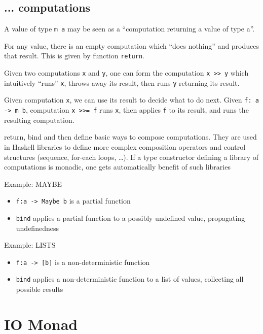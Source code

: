 \subsection{... computations}

A value of type \lstinline|m a| may be seen as a ``computation returning a value of type a''.

For any value, there is an empty computation which ``does nothing'' and
produces that result. This is given by function \lstinline|return|.

Given two computations \lstinline|x| and \lstinline|y|, one can form the computation
\lstinline|x >> y| which intuitively ``runs'' \lstinline|x|, throws away its result, then runs \lstinline|y| returning its result.

Given computation \lstinline|x|, we can use its result to decide what to do next.
Given \lstinline|f: a -> m b|, computation \lstinline|x >>= f| runs \lstinline|x|, then applies
\lstinline|f| to its result, and runs the resulting computation.


return, bind and then define basic ways to compose computations.
They are used in Haskell libraries to define more complex composition
operators and control structures (sequence, for-each loops, \dots).
If a type constructor defining a library of computations is monadic, one
gets automatically benefit of such libraries

Example: MAYBE
\begin{itemize}
	\item \lstinline|f:a -> Maybe b| is a partial function
	\item \lstinline|bind| applies a partial function to a possibly undefined value, propagating undefinedness
\end{itemize}
Example: LISTS
\begin{itemize}
	\item \lstinline|f:a -> [b]| is a non-deterministic function
	\item \lstinline|bind| applies a non-deterministic function to a list of values, collecting all possible results

\end{itemize}
\section{IO Monad}
